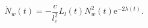 \begin{equation}
\dot  N_w(t)
   = - \frac{c}{l^2_c} L_l(t) N^2_w(t) \mathrm{e}^{-2\lambda(t)}.
\label{eq:winding_energy_rate}
\end{equation}

